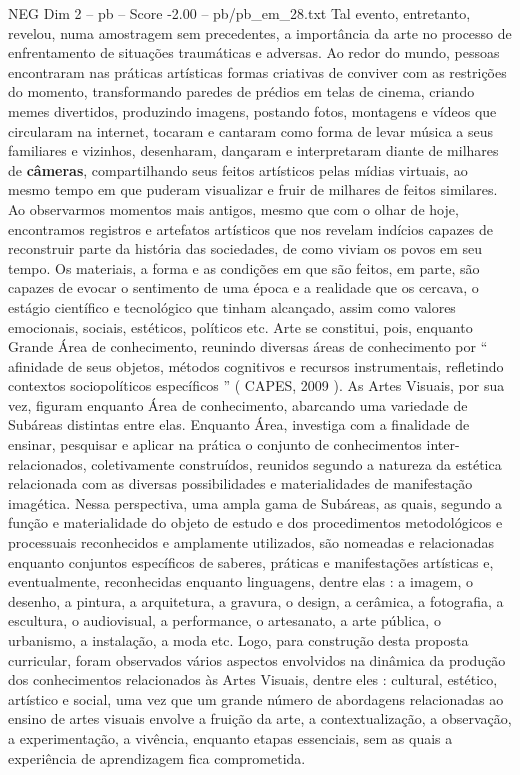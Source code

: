 \begin{textsample}{NEG Dim 2 – pb – Score -2.00 – pb/pb\_em\_28.txt}
Tal evento, entretanto, revelou, numa amostragem sem precedentes, a importância da arte no processo de enfrentamento de situações traumáticas e adversas.
Ao redor do mundo, pessoas encontraram nas práticas artísticas formas criativas de conviver com as restrições do momento, transformando paredes de prédios em telas de cinema, criando memes divertidos, produzindo imagens, postando fotos, montagens e vídeos que circularam na internet, tocaram e cantaram como forma de levar música a seus familiares e vizinhos, desenharam, dançaram e interpretaram diante de milhares de \textbf{câmeras}, compartilhando seus feitos artísticos pelas mídias virtuais, ao mesmo tempo em que puderam visualizar e fruir de milhares de feitos similares.
Ao observarmos momentos mais antigos, mesmo que com o olhar de hoje, encontramos registros e artefatos artísticos que nos revelam indícios capazes de reconstruir parte da história das sociedades, de como viviam os povos em seu tempo.
Os materiais, a forma e as condições em que são feitos, em parte, são capazes de evocar o sentimento de uma época e a realidade que os cercava, o estágio científico e tecnológico que tinham alcançado, assim como valores emocionais, sociais, estéticos, políticos etc.
Arte se constitui, pois, enquanto Grande Área de conhecimento, reunindo diversas áreas de conhecimento por “ afinidade de seus objetos, métodos cognitivos e recursos instrumentais, refletindo contextos sociopolíticos específicos ” ( CAPES, 2009 ).
As Artes Visuais, por sua vez, figuram enquanto Área de conhecimento, abarcando uma variedade de Subáreas distintas entre elas.
Enquanto Área, investiga com a finalidade de ensinar, pesquisar e aplicar na prática o conjunto de conhecimentos inter-relacionados, coletivamente construídos, reunidos segundo a natureza da estética relacionada com as diversas possibilidades e materialidades de manifestação imagética.
Nessa perspectiva, uma ampla gama de Subáreas, as quais, segundo a função e materialidade do objeto de estudo e dos procedimentos metodológicos e processuais reconhecidos e amplamente utilizados, são nomeadas e relacionadas enquanto conjuntos específicos de saberes, práticas e manifestações artísticas e, eventualmente, reconhecidas enquanto linguagens, dentre elas : a imagem, o desenho, a pintura, a arquitetura, a gravura, o design, a cerâmica, a fotografia, a escultura, o audiovisual, a performance, o artesanato, a arte pública, o urbanismo, a instalação, a moda etc.
Logo, para construção desta proposta curricular, foram observados vários aspectos envolvidos na dinâmica da produção dos conhecimentos relacionados às Artes Visuais, dentre eles : cultural, estético, artístico e social, uma vez que um grande número de abordagens relacionadas ao ensino de artes visuais envolve a fruição da arte, a contextualização, a observação, a experimentação, a vivência, enquanto etapas essenciais, sem as quais a experiência de aprendizagem fica comprometida.

\end{textsample}
